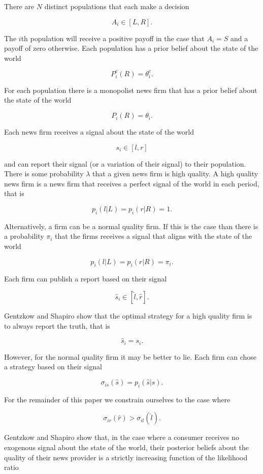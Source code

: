 \documentclass[a4paper]{article}
\begin{document}
There are $N$ distinct populations that each make a decision

\[A_i \in [L, R].\]

The $i$th population will receive a positive payoff in the case that $A_i = S$ and a payoff of zero otherwise.  Each population has a prior belief about the state of the world

\[P_i^c(R) = \theta_i^c.\]

For each population there is a monopolist news firm that has a prior belief about the state of the world

\[P_i(R) = \theta_i.\]

Each news firm receives a signal about the state of the world

\[s_i \in[l, r]\]

and can report their signal (or a variation of their signal) to their population.  There is some probability $\lambda$ that a given news firm is high quality.  A high quality news firm is a news firm that receives a perfect signal of the world in each period, that is

\[p_i(l|L) = p_i(r|R) =1.\]

Alternatively, a firm can be a normal quality firm.  If this is the case than there is a probability $\pi_i$ that the firms receives a signal that aligns with the state of the world

\[p_i(l|L) = p_i(r|R) = \pi_i.\]

Each firm can publish a report based on their signal

\[\hat{s}_i \in [\hat{l}, \hat{r}].\]

Gentzkow and Shapiro show that the optimal strategy for a high quality firm is to always report the truth, that is

\[\hat{s}_i = s_i.\]

However, for the normal quality firm it may be better to lie.  Each firm can chose a strategy based on their signal

\[\sigma_{is}(\hat{s}) = p_i(\hat{s}|s).\]

For the remainder of this paper we constrain ourselves to the case where 

\[\sigma_{ir}(\hat{r}) > \sigma_{il}(\hat{l}).\]

Gentzkow and Shapiro show that, in the case where a consumer receives no exogenous signal about the state of the world, their posterior beliefs about the quality of their news provider is a strictly increasing function of the likelihood ratio
\end{document}
